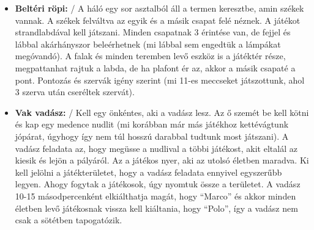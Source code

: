 \documentclass[a4paper, 12pt, twoside, openright]{article}
\begin{document}
\begin{itemize}
\item \textbf{Beltéri röpi:} / A háló egy sor asztalból áll a termen keresztbe, amin székek vannak. A székek felváltva az egyik és a másik csapat felé néznek. A játékot strandlabdával kell játszani. Minden csapatnak 3 érintése van, de fejjel és lábbal akárhányszor beleérhetnek (mi lábbal sem engedtük a lámpákat megóvandó). A falak és minden teremben levő eszköz is a játéktér része, megpattanhat rajtuk a labda, de ha plafont ér az, akkor a másik csapaté a pont. Pontozás és szervák igény szerint (mi 11-es meccseket játszottunk, ahol 3 szerva után cseréltek szervát).

\item \textbf{Vak vadász:} / Kell egy önkéntes, aki a vadász lesz. Az ő szemét be kell kötni és kap egy medence nudlit (mi korábban már más játékhoz kettévágtunk jópárat, úgyhogy így nem túl hosszú darabbal tudtunk most játszani). A vadász feladata az, hogy megüsse a nudlival a többi játékost, akit eltalál az kiesik és lejön a pályáról. Az a játékos nyer, aki az utolsó életben maradva. Ki kell jelölni a játékterületet, hogy a vadász feladata ennyivel egyszerűbb legyen. Ahogy fogytak a játékosok, úgy nyomtuk össze a területet. A vadász 10-15 másodpercenként elkiálthatja magát, hogy “Marco” és akkor minden életben levő játékosnak vissza kell kiáltania, hogy “Polo”, így a vadász nem csak a sötétben tapogatózik.


\end{itemize}
\end{document}
